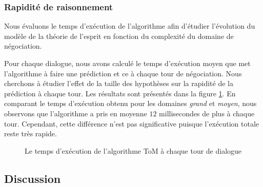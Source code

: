 	
	\subsubsection{Rapidité de raisonnement}
	Nous évaluons le temps d'exécution de l'algorithme afin d'étudier l'évolution du modèle de la théorie de l'esprit en fonction du complexité du domaine de négociation.
	
	Pour chaque dialogue, nous avons calculé le temps d'exécution moyen que met l'algorithme à faire une prédiction et ce à chaque tour de négociation. 
	Nous cherchons à étudier l'effet de la taille des hypothèses sur la rapidité de la prédiction à chaque tour. Les résultats sont présentés dans la figure \ref{fig:time}. En comparant  le temps d'exécution obtenu pour les domaines \emph{grand} et \emph{moyen}, nous observons que l'algorithme a pris en moyenne $12$ millisecondes de plus à chaque tour. Cependant, cette différence n'est pas significative puisque l'exécution totale reste très rapide.
	\begin{figure}[h]
		\caption{Le temps d'exécution de l'algorithme ToM à chaque tour de dialogue} 
		\label{fig:time}
	\end{figure}
	

	\subsection{Discussion}
	
